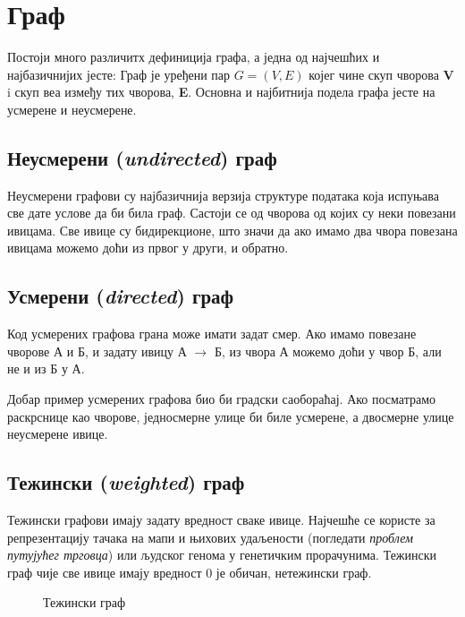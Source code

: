 \documentclass[11pt, oneside, a4paper]{article}
\begin{document}
\newpage
\section{Граф}
Постоји много различитх дефиниција графа, а једна од најчешћих и најбазичнијих јесте: \glqq Граф је уређени пар $G=(V, E)$ којег чине скуп чворова \textbf{V} i скуп веа између тих чворова, \textbf{E}. Основна и најбитнија подела графа јесте на усмерене и неусмерене.
\subsection{Неусмерени (\textit{undirected}) граф}
Неусмерени графови су најбазичнија верзија структуре података која испуњава све дате услове да би била граф. Састоји се од чворова од којих су неки повезани ивицама. Све ивице су бидирекционе, што значи да ако имамо два чвора повезана ивицама можемо доћи из првог у други, и обратно.
\subsection{Усмерени (\textit{directed}) граф}
Код усмерених графова грана може имати задат смер. Ако имамо повезане чворове А и Б, и задату ивицу А $\rightarrow$ Б, из чвора А можемо доћи у чвор Б, али не и из Б у А.\par Добар пример усмерених графова био би градски саобораћај. Ако посматрамо раскрснице као чворове, једносмерне улице би биле усмерене, а двосмерне улице неусмерене ивице.
\subsection{Тежински (\textit{weighted}) граф}
Тежински графови имају задату вредност сваке ивице. Најчешће се користе за репрезентацију тачака на мапи и њихових удаљености (погледати \textit{проблем путујућег трговца}) или људског генома у генетичким прорачунима. Тежински граф чије све ивице имају вредност 0 је обичан, нетежински граф.
\begin{figure}[ht]
    \centering
    \caption{Тежински граф}
    \label{fig:my_label}
\end{figure}
\end{document}
